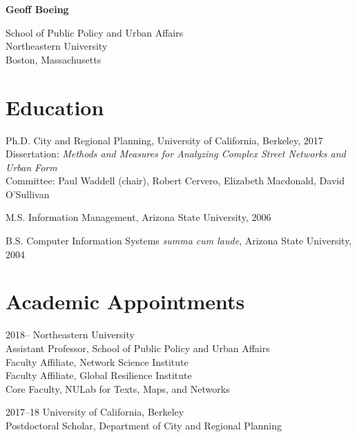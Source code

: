 \documentclass[12pt,letterpaper]{report}
\newcommand{\myname}{Geoff Boeing}
\newcommand{\namefont}[1]{{\normalfont\bfseries\Huge{#1}}}
\begin{document}
	\raggedright
	
	\namefont{\myname}
	
	\vspace{1em}
	\begin{minipage}[t]{0.495\textwidth}
		School of Public Policy and Urban Affairs \\
		Northeastern University \\
		Boston, Massachusetts
	\end{minipage}
	\vspace{0.5em}
	
	
	
	\section*{Education}
	
	\begin{tablist}
		
		\item[Ph.D.] \tab City and Regional Planning, University of California, Berkeley, 2017 \\
		Dissertation: \textit{Methods and Measures for Analyzing Complex Street Networks and Urban Form} \\
		Committee: Paul Waddell (chair), Robert Cervero, Elizabeth Macdonald, David O'Sullivan
		
		\item[M.S.]  \tab Information Management, Arizona State University, 2006
		
		\item[B.S.]  \tab Computer Information Systems \textit{summa cum laude}, Arizona State University, 2004
		
	\end{tablist}
	
	
	
	\section*{Academic Appointments}
	
	\begin{tablist}                     
		
		\item[2018--]   \tab Northeastern University \\
		Assistant Professor, School of Public Policy and Urban Affairs \\
		Faculty Affiliate, Network Science Institute \\
		Faculty Affiliate, Global Resilience Institute \\
		Core Faculty, NULab for Texts, Maps, and Networks
		
		
		\item[2017--18] \tab University of California, Berkeley \\
		Postdoctoral Scholar, Department of City and Regional Planning
		
		
	\end{tablist}
	
\end{document}
